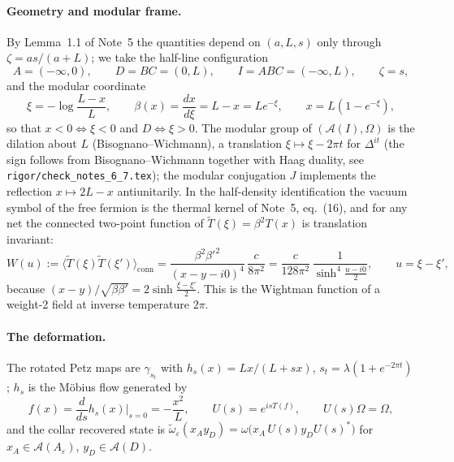 \documentclass[11pt]{article}
\theoremstyle{accent}
\theoremstyle{definition}
\newcommand{\cA}{\mathcal{A}}
\newcommand{\eps}{\varepsilon}
\begin{document}
\paragraph{Geometry and modular frame.}
By Lemma~1.1 of Note~5 the quantities depend on \((a,L,s)\) only through \(\zeta=as/(a+L)\); we take the half-line configuration
\[
 A=(-\infty,0),\qquad D=BC=(0,L),\qquad I=ABC=(-\infty,L),\qquad \zeta=s,
\]
and the modular coordinate
\begin{equation}\label{eq:xi}
 \xi=-\log\frac{L-x}{L},\qquad \beta(x)=\frac{dx}{d\xi}=L-x=Le^{-\xi},\qquad x=L(1-e^{-\xi}),
\end{equation}
so that \(x<0\Leftrightarrow\xi<0\) and \(D\Leftrightarrow\xi>0\).  The modular group of \((\cA(I),\Omega)\) is the dilation about \(L\) (Bisognano--Wichmann), a translation \(\xi\mapsto\xi-2\pi t\) for \(\Delta^{it}\) (the sign follows from Bisognano--Wichmann together with Haag duality, see \texttt{rigor/check\_notes\_6\_7.tex}); the modular conjugation \(J\) implements the reflection \(x\mapsto2L-x\) antiunitarily.  In the half-density identification the vacuum symbol of the free fermion is the thermal kernel of Note~5, eq.~(16), and for any net the connected two-point function of \(\widetilde T(\xi)=\beta^2T(x)\) is translation invariant:
\begin{equation}\label{eq:W}
 W(u):=\langle\widetilde T(\xi)\widetilde T(\xi')\rangle_{\mathrm{conn}}
 =\frac{\beta^2\beta'^2}{(x-y-i0)^4}\,\frac{c}{8\pi^2}
 =\frac{c}{128\pi^2}\,\frac{1}{\sinh^4\frac{u-i0}{2}},\qquad u=\xi-\xi',
\end{equation}
because \((x-y)/\sqrt{\beta\beta'}=2\sinh\frac{\xi-\xi'}{2}\).  This is the Wightman function of a weight-2 field at inverse temperature \(2\pi\).

\paragraph{The deformation.}
The rotated Petz maps are \(\gamma_{s_t}\) with \(h_s(x)=Lx/(L+sx)\), \(s_t=\lambda(1+e^{-2\pi t})\); \(h_s\) is the M\"obius flow generated by
\begin{equation}\label{eq:f}
 f(x)=\frac{d}{ds}h_s(x)\Big|_{s=0}=-\frac{x^2}{L},\qquad U(s)=e^{isT(f)},\qquad U(s)\Omega=\Omega,
\end{equation}
and the collar recovered state is \(\widetilde\omega_\eps(x_Ay_D)=\omega\bigl(x_A\,U(s)y_DU(s)^*\bigr)\) for \(x_A\in\cA(A_\eps)\), \(y_D\in\cA(D)\).
\end{document}
